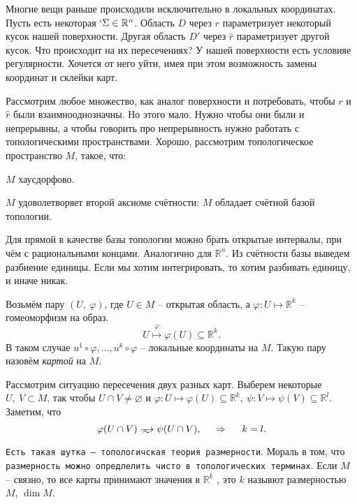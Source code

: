 Многие вещи раньше происходили исключительно в локальных координатах. 
Пусть есть некоторая $`\Sigma \in \mathbb{R}^n$. Область $D$ через $r$  параметризует некоторый кусок нашей поверхности. Другая область $D'$ через $\hat{r}$ параметризует другой кусок. Что происходит на их пересечениях?
У нашей поверхности есть условияе регулярности.  Хочется от него уйти, имея при этом возможность замены координат и склейки карт.

Рассмотрим любое множество, как аналог поверхности и потребовать, чтобы $r$ и $\hat{r}$ были взаимнооднозначны. Но этого мало. Нужно чтобы они были и непрерывны, а чтобы говорить про непрерывность нужно работать с топологическими пространствами. Хорошо, рассмотрим топологическое пространство $M$, такое, что:

\vspace{-10pt}
\begin{enumerate*}
    \item $M$ хаусдорфово.
    \item $M$ удоволетворяет второй аксиоме счётности: $M$ обладает счётной базой топологии.
\end{enumerate*}
\vspace{-10pt}

\begin{to_exm} Для прямой в качестве базы топологии можно брать открытые интервалы, при чём с рациональными концами. Аналогично для $\mathbb{R}^n$. Из счётности базы выведем разбиение единицы. Если мы хотим интегрировать, то хотим разбивать единицу, и иначе никак. 
\end{to_exm}

\begin{to_def} 
    Возьмём пару $(U, \ \varphi)$, где $U \in M$ -- открытая область, а $\varphi \colon U \mapsto \mathbb{R}^k$ -- гомеоморфизм на образ.
\begin{equation*}
    U \overset{\varphi}{\mapsto} \varphi(U) \subseteq \mathbb{R}^k.
\end{equation*}
В таком случае $u^1 \circ \varphi, \ldots, u^k \circ \varphi$ -- локальные координаты на $M$. Такую пару назовём \textit{картой} на $M$.
\end{to_def}

Рассмотрим ситуацию пересечения двух разных карт. Выберем некоторые $U, \ V \subset M$, так чтобы $U \cap V \neq \varnothing$ и $\varphi \colon U \mapsto \varphi(U) \subseteq \mathbb{R}^k, \ \psi \colon V \mapsto \psi(V) \subseteq \mathbb{R}^l$. Заметим, что 
\begin{equation*}
    \varphi(U \cap V) \home \psi (U \cap V),
    \hspace{0.5cm} \Rightarrow \hspace{0.5cm} 
    k = l.
\end{equation*}
\texttt{Есть такая шутка -- топологичская теория размерности}. Мораль в том, что \texttt{размерность можно опредлелить чисто в топологических терминах}. Если $M$ -- связно, то все карты принимают значения в $\mathbb{R}^k$ , это $k$ назывют размерностью $M$, $\dim M$. 


